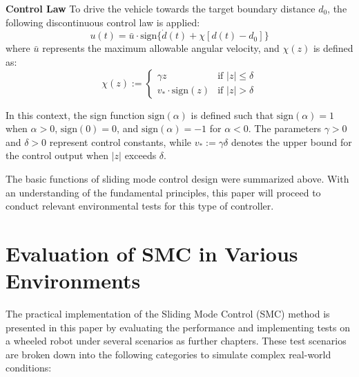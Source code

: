 \textbf{Control Law}
To drive the vehicle towards the target boundary distance \( d_0 \), the following discontinuous control law is applied:
\begin{equation}
u(t) = \bar{u} \cdot \text{sign}\{\dot{d}(t) + \chi[d(t) - d_0]\}
\label{eq:control_law}
\end{equation}
where \( \bar{u} \) represents the maximum allowable angular velocity, and \( \chi(z) \) is defined as:
\begin{equation}
\chi(z) := \begin{cases} 
      \gamma z & \text{if } |z| \leq \delta \\
      v_* \cdot \text{sign}(z) & \text{if } |z| > \delta 
   \end{cases}
\label{eq:chi_definition}
\end{equation}

In this context, the sign function \(\text{sign}(\alpha)\) is defined such that \(\text{sign}(\alpha) = 1\) when \(\alpha > 0\), \(\text{sign}(0) = 0\), and \(\text{sign}(\alpha) = -1\) for \(\alpha < 0\). The parameters \(\gamma > 0\) and \(\delta > 0\) represent control constants, while \(v_\ast := \gamma \delta\) denotes the upper bound for the control output when \(|z|\) exceeds \(\delta\).

The basic functions of sliding mode control design were summarized above. With an understanding of the fundamental principles, this paper will proceed to conduct relevant environmental tests for this type of controller.


\section{Evaluation of SMC in Various Environments}

The practical implementation of the Sliding Mode Control (SMC) method is presented in this paper by evaluating the performance and implementing tests on a wheeled robot under several scenarios as further chapters. These test scenarios are broken down into the following categories to simulate complex real-world conditions:

